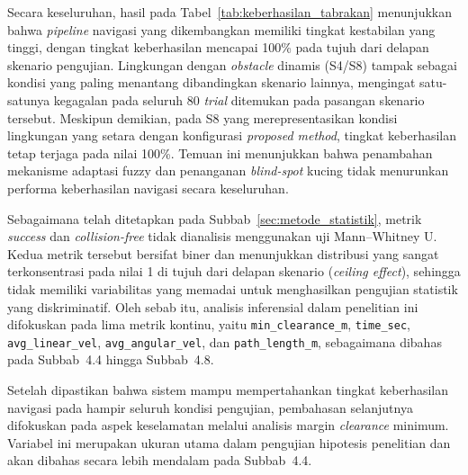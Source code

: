 Secara keseluruhan, hasil pada Tabel~\ref{tab:keberhasilan_tabrakan} menunjukkan bahwa \textit{pipeline} navigasi yang dikembangkan memiliki tingkat kestabilan yang tinggi, dengan tingkat keberhasilan mencapai 100\% pada tujuh dari delapan skenario pengujian. Lingkungan dengan \textit{obstacle} dinamis (S4/S8) tampak sebagai kondisi yang paling menantang dibandingkan skenario lainnya, mengingat satu-satunya kegagalan pada seluruh 80 \textit{trial} ditemukan pada pasangan skenario tersebut. Meskipun demikian, pada S8 yang merepresentasikan kondisi lingkungan yang setara dengan konfigurasi \textit{proposed method}, tingkat keberhasilan tetap terjaga pada nilai 100\%. Temuan ini menunjukkan bahwa penambahan mekanisme adaptasi fuzzy dan penanganan \textit{blind-spot} kucing tidak menurunkan performa keberhasilan navigasi secara keseluruhan.

Sebagaimana telah ditetapkan pada Subbab~\ref{sec:metode_statistik}, metrik \textit{success} dan \textit{collision-free} tidak dianalisis menggunakan uji Mann--Whitney U. Kedua metrik tersebut bersifat biner dan menunjukkan distribusi yang sangat terkonsentrasi pada nilai 1 di tujuh dari delapan skenario (\textit{ceiling effect}), sehingga tidak memiliki variabilitas yang memadai untuk menghasilkan pengujian statistik yang diskriminatif. Oleh sebab itu, analisis inferensial dalam penelitian ini difokuskan pada lima metrik kontinu, yaitu \texttt{min\_clearance\_m}, \texttt{time\_sec}, \texttt{avg\_linear\_vel}, \texttt{avg\_angular\_vel}, dan \texttt{path\_length\_m}, sebagaimana dibahas pada Subbab~4.4 hingga Subbab~4.8.

Setelah dipastikan bahwa sistem mampu mempertahankan tingkat keberhasilan navigasi pada hampir seluruh kondisi pengujian, pembahasan selanjutnya difokuskan pada aspek keselamatan melalui analisis margin \textit{clearance} minimum. Variabel ini merupakan ukuran utama dalam pengujian hipotesis penelitian dan akan dibahas secara lebih mendalam pada Subbab~4.4.
